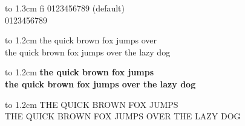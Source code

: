 \documentclass[10pt]{article}
\begin{document}



\vbox to 1.3cm{ %
{\LARGE fi} 0123456789 (default)\\
0123456789
}

\vbox to 1.2cm{
the quick brown fox jumps over\\
\calligra the quick brown fox jumps over the lazy dog
}

\vbox to 1.2cm{
\bfseries the quick brown fox jumps\\
\calligra \bfseries the quick brown fox jumps over the lazy dog
}

\vbox to 1.2cm{
THE QUICK BROWN FOX JUMPS\\
\calligra THE QUICK BROWN FOX JUMPS OVER THE LAZY DOG
}

\end{document}
